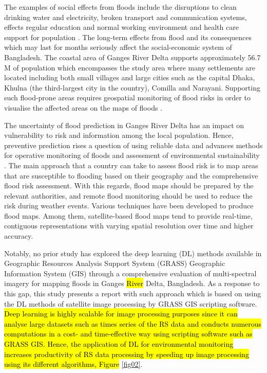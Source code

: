 \documentclass[water,article,submit,pdftex,moreauthors]{Definitions/mdpi}
\begin{document}
The examples of social effects from floods include the disruptions to clean drinking water and electricity, broken transport and communication systems, effects regular education and normal working environment and health care support for population \cite{JERIN2023103851,NAHIN2023e14520}. The long-term effects from flood and its consequences which may last for months  seriously affect the social-economic system of Bangladesh. The coastal area of Ganges River Delta supports approximately 56.7 M of population which encompasses the study area \cite{DAS2021101983} where many settlements are located including both small villages and large cities such as the capital Dhaka, Khulna (the third-largest city in the country), Comilla and Narayani. Supporting such flood-prone areas requires geospatial monitoring of flood risks in order to visualise the affected areas on the maps of floods \cite{Alietal,AZAD2023100498}.

The uncertainty of flood prediction in Ganges River Delta has an impact on vulnerability to risk and information among the local population. Hence, preventive prediction rises a question of using reliable data and advances methods for operative monitoring of floods and assessment of environmental sustainability \cite{NICHOLLS2016370}. The main approach that a country can take to assess flood risk is to map areas that are susceptible to flooding based on their geography and the comprehensive flood risk assessment. With this regards, flood maps should be prepared by the relevant authorities, and remote flood monitoring should be used to reduce the risk during weather events. Various techniques have been developed to produce flood maps. Among them, satellite-based flood maps tend to provide real-time, contiguous representations with varying spatial resolution over time and higher accuracy.

Notably, no prior study has explored the deep learning (DL) methods available in Geographic Resources Analysis Support System (GRASS) Geographic Information System (GIS) \cite{GRASS_GIS_software} through a comprehensive evaluation of multi-spectral imagery for mapping floods in Ganges \hl{River} Delta, Bangladesh. As a response to this gap, this study presents a report with such approach which is based on using the DL methods of satellite image processing by GRASS GIS scripting software. \hl{Deep learning is highly scalable for image processing purposes since it can analyse large datasets such as times series of the RS data and conducts numerous computations in a cost- and time-effective way using scripting software such as GRASS GIS. Hence, the application of DL for environmental monitoring increases productivity of RS data processing by speeding up image processing using its different algorithms, Figure} \ref{fig02}. 
\end{document}
